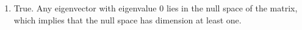 \begin{exercises}
\begin{problist}
\begin{solution}
\begin{enumerate}
				\item True. Any eigenvector with eigenvalue $0$ lies in the
					null space of the matrix, which implies that the null
					space has dimension at least one.
			\end{enumerate}
		\end{solution}
	\end{problist}
\end{exercises}
